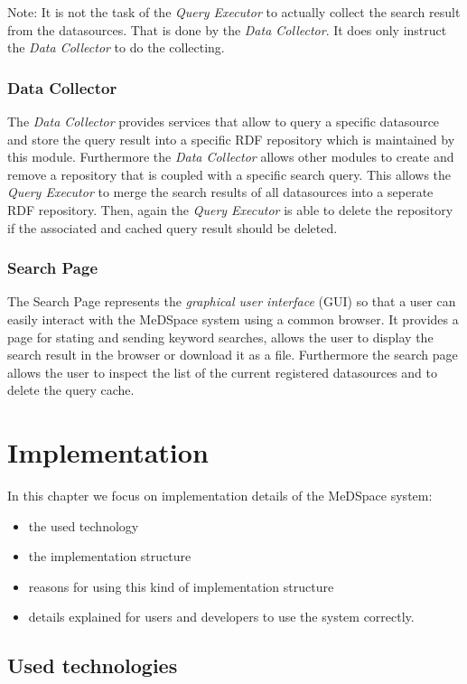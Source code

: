 Note: It is not the task of the \emph{Query Executor} to actually collect the search result from the datasources. That is done by the \emph{Data Collector}. It does only instruct the \emph{Data Collector} to do the collecting.

\subsection{Data Collector}
The \emph{Data Collector} provides services that allow to query a specific  datasource and store the query result into a specific RDF repository which is maintained by this module. Furthermore the \emph{Data Collector} allows other modules to create and remove a repository that is coupled with a specific search query. This allows the \emph{Query Executor} to merge the search results of all datasources into a seperate RDF repository. Then, again the \emph{Query Executor} is able to delete the repository if the associated and cached query result should be deleted. 

\subsection{Search Page}
The Search Page represents the \emph{graphical user interface} (GUI) so that a user can easily interact with the MeDSpace system using a common browser. It provides a page for stating and sending keyword searches, allows the user to display the search result in the browser or download it as a file. Furthermore the search page allows the user to inspect the list of the current registered datasources and to delete the query cache.

\chapter{Implementation}
In this chapter we focus on implementation details of the MeDSpace system: 

\begin{itemize}
\item the used technology
\item the implementation structure
\item reasons for using this kind of    
   implementation structure
\item details explained for users and developers to 
   use the system correctly. 
\end{itemize}

\section{Used technologies}

